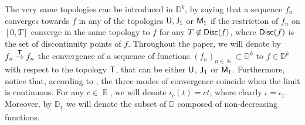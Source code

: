 \documentclass[]{amsart}
\numberwithin{equation}{section}
\theoremstyle{remark}
\theoremstyle{definition}
\DeclareMathOperator{\N}{\mathbb{N}}
\DeclareMathOperator{\R}{\mathbb{R}}
\begin{document}
The very same topologies can be introduced in $\mathbb{D}^k$, by saying that a sequence $f_n$ converges towards $f$ in any of the topologies ${\sf U},{\sf J_1}$ or ${\sf M_1}$ if the restriction of $f_n$ on $[0,T]$ converge in the same topology to $f$ for any $T \not \in {\sf Disc}(f)$, where ${\sf Disc}(f)$ is the set of discontinuity points of $f$.
Throughout the paper, we will denote by $f_n \overset{{\sf T}}{\to} f_n$ the convergence of a sequence of functions $(f_n)_{n \in \N} \subset \mathbb{D}^k$ to $f \in \mathbb{D}^k$ with respect to the topology ${\sf T}$, that can be either ${\sf U}$, ${\sf J}_1$ or ${\sf M}_1$. {Furthermore, notice that, according to \cite[Theorem 12.4.1, Lemma 12.4.2, Theorem 12.5.1]{whitt2002stochastic}, the three modes of convergence coincide when the limit is continuous.} For any $c \in \R$, we will denote $\iota_c(t)=ct$, where clearly $\iota=\iota_1$. Moreover, by $\mathbb{D}_{\uparrow}$ we will denote the subset of $\mathbb{D}$ composed of non-decreasing functions. 
\end{document}
